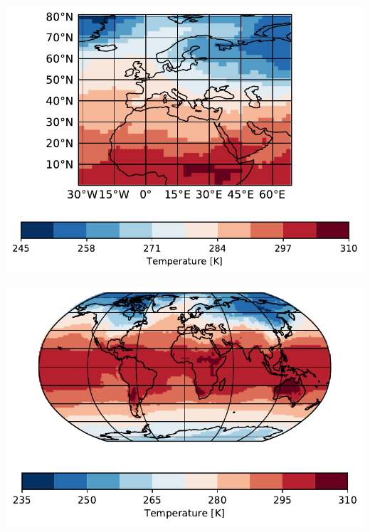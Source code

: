\documentclass[
11pt, %
english, %
singlespacing, %
headsepline, %
]{article} %
\begin{document}
\begin{refsection}
\begin{subappendices}
	\includegraphics[width=0.45\linewidth]{psyplot-figures/example-call.pdf}
	
	
	\includegraphics[width=0.6\linewidth]{psyplot-figures/example-update.pdf}

\end{subappendices}\

\clearpage

\printnoidxglossary[type=acronym, title={List of Abbreviations}]

\printbibliography

\end{refsection}


%
%
%
%


%
%

\end{document}
